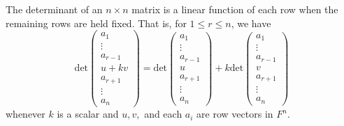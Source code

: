 \begin{theorem}
    The determinant of an \( n \times n  \) matrix is a linear function of each row when the remaining rows are held fixed. That is, for \( 1 \leq r \leq n  \), we have 
    \[  \text{det} \begin{pmatrix} 
               {a}_{1} \\
               \vdots \\ 
               {a}_{r-1} \\
               u + kv \\
               {a}_{r+1} \\
               \vdots \\
               {a}_{n}
              \end{pmatrix} = \text{det}\begin{pmatrix} 
                         {a}_{1} \\
                         \vdots \\
                         {a}_{r-1} \\
                         u \\ 
                         {a}_{r+1} \\
                         \vdots \\
                         {a}_{n}
                        \end{pmatrix}  + k \text{det} \begin{pmatrix} 
                                   {a}_{1} \\
                                   \vdots \\
                                   {a}_{r-1} \\
                                   v \\
                                   {a}_{r+1} \\
                                   \vdots \\
                                   {a}_{n}
                                  \end{pmatrix}   \]
whenever \( k  \) is a scalar and \( u,v, \) and each \( {a}_{i} \) are row vectors in \( F^{n} \).
\end{theorem}
